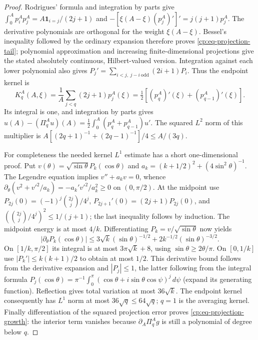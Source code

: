 \begin{proof}
Rodrigues' formula and integration by parts give
$\int_0^Ap_i^Ap_j^A=A\mathbf1_{i=j}/(2j+1)$ and
$-[\xi(A-\xi)(p_j^A)']'=j(j+1)p_j^A$.
The derivative polynomials are orthogonal for the weight
$\xi(A-\xi)$.  Bessel's inequality followed by the ordinary expansion
therefore proves \eqref{cp:eq-projection-tail}; polynomial approximation
and increasing finite-dimensional projections give the stated
absolutely continuous, Hilbert-valued version.
Integration against each lower polynomial also gives
$P_j'=\sum_{i<j,\ j-i\ \mathrm{odd}}(2i+1)P_i$.  Thus the endpoint kernel is
\[
 K_q^A(A,\xi)=\frac1A\sum_{j<q}(2j+1)p_j^A(\xi)
            =\tfrac12[(p_q^A)'(\xi)+(p_{q-1}^A)'(\xi)].
\]
Its integral is one, and integration by parts gives
$u(A)-(\Pi_q^Au)(A)=\tfrac12\int_0^A(p_q^A+p_{q-1}^A)u'$.
The squared $L^2$ norm of this multiplier is
$A[(2q+1)^{-1}+(2q-1)^{-1}]/4\le A/(3q)$.

For completeness the needed kernel $L^1$ estimate has a short
one-dimensional proof.  Put
$v(\theta)=\sqrt{\sin\theta}P_k(\cos\theta)$ and
$a_k=(k+1/2)^2+(4\sin^2\theta)^{-1}$.  The Legendre equation implies
$v''+a_kv=0$, whence
$\partial_\theta(v^2+v'^2/a_k)=-a_k'v'^2/a_k^2\ge0$ on
$(0,\pi/2)$.  At the midpoint use
$P_{2j}(0)=(-1)^j\binom{2j}j/4^j$,
$P_{2j+1}'(0)=(2j+1)P_{2j}(0)$, and
$(\binom{2j}j/4^j)^2\le1/(j+1)$; the last inequality follows by
induction.  The midpoint energy is at most $4/k$.  Differentiating
$P_k=v/\sqrt{\sin\theta}$ now yields
\[
 |\partial_\theta P_k(\cos\theta)|
 \le3\sqrt{k}(\sin\theta)^{-1/2}
       +2k^{-1/2}(\sin\theta)^{-3/2}.
\]
On $[1/k,\pi/2]$ its integral is at most $3\pi\sqrt{k}+8$,
using $\sin\theta\ge2\theta/\pi$.  On $[0,1/k]$ use
$|P_k'|\le k(k+1)/2$ to obtain at most $1/2$.
This derivative bound follows from the derivative expansion and
$|P_j|\le1$, the latter following from the integral formula
$P_j(\cos\theta)=\pi^{-1}\int_0^\pi
(\cos\theta+i\sin\theta\cos\psi)^j\,d\psi$ (expand its generating
function).  Reflection gives total variation at most $36\sqrt k$.
The endpoint kernel consequently has $L^1$ norm at most
$36\sqrt q\le64\sqrt q$; $q=1$ is the averaging kernel.
Finally differentiation of the squared projection error proves
\eqref{cp:eq-projection-growth}: the interior term vanishes because
$\partial_A\Pi_q^Ag$ is still a polynomial of degree below $q$.
\end{proof}

